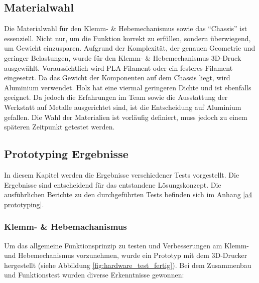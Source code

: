 \documentclass[../main.tex]{subfiles}
\begin{document}
\subsection{Materialwahl}
Die Materialwahl für den Klemm- \& Hebemechanismus sowie das \enquote{Chassis} ist essenziell. Nicht nur, um die Funktion korrekt zu erfüllen, sondern überwiegend, um Gewicht einzusparen. Aufgrund der Komplexität, der genauen Geometrie und geringer Belastungen, wurde für den Klemm- \& Hebemechanismus 3D-Druck ausgewählt. Voraussichtlich wird PLA-Filament oder ein festeres Filament eingesetzt. Da das Gewicht der Komponenten auf dem Chassis liegt, wird Aluminium verwendet. Holz hat eine viermal geringeren Dichte und ist ebenfalls geeignet. Da jedoch die Erfahrungen im Team sowie die Ausstattung der Werkstatt auf Metalle ausgerichtet sind, ist die Entscheidung auf Aluminium gefallen. Die Wahl der Materialien ist vorläufig definiert, muss jedoch zu einem späteren Zeitpunkt getestet werden.



\subsection{Prototyping Ergebnisse}
In diesem Kapitel werden die Ergebnisse verschiedener Tests vorgestellt. Die Ergebnisse sind entscheidend für das entstandene Lösungskonzept.
Die ausführlichen Berichte zu den durchgeführten Tests befinden sich im Anhang \ref{a4 prototyping}.

\subsubsection{Klemm- \& Hebemachanismus} \label{sec:hardware_greifarm}
Um das allgemeine Funktionsprinzip zu testen und Verbesserungen am Klemm- und Hebemechanismus vorzunehmen, wurde ein Prototyp mit dem 3D-Drucker hergestellt (siehe Abbildung \ref{fig:hardware_test_fertig}). Bei dem Zusammenbau und Funktionstest wurden diverse Erkenntnisse gewonnen:
\end{document}
